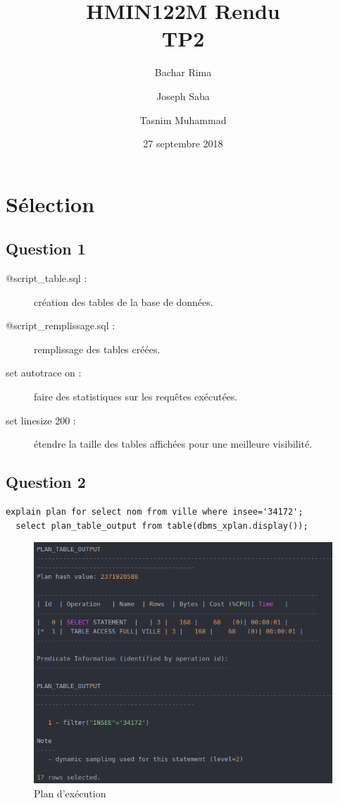 \documentclass[a4paper,12pt]{article}
\title{
  HMIN122M Rendu \\
  \large TP2
}
\author{Bachar Rima \and Joseph Saba \and Tasnim Muhammad}
\date{27 septembre 2018}
\begin{document}
\pagestyle{plain}

\maketitle

{
  \hypersetup{linkcolor=black}
  \tableofcontents
}

\section{Sélection}
\subsection{Question 1}
\begin{description}
  \item [@script\_table.sql :] création des tables de la base de données.
  \item [@script\_remplissage.sql :] remplissage des tables créées.
  \item [set autotrace on :] faire des statistiques sur les requêtes exécutées.
  \item [set linesize 200 :] étendre la taille des tables affichées pour une meilleure visibilité.
\end{description}

\subsection{Question 2}
\begin{lstlisting}[caption={requêtes permettant d'expliquer le plan d'exécution affichant le nom des villes dont le numéro insee est 34172}, label={lst:question_2}]
  explain plan for select nom from ville where insee='34172';
  select plan_table_output from table(dbms_xplan.display());
\end{lstlisting}

\begin{figure}[!ht]
  \centering
  \includegraphics[scale=0.6]{images/q2_1.png}
  \caption{Plan d'exécution}
\end{figure}
\end{document}
